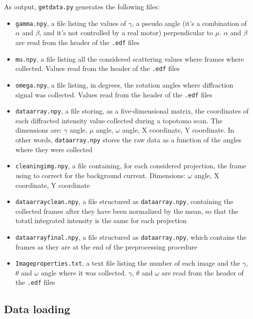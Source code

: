 \documentclass[11pt]{scrartcl}
\begin{document}
As output, {\texttt{getdata.py}} generates the following files:

\begin{itemize}
    \item {\texttt{gamma.npy}}, a file listing the values of $\gamma$, a pseudo angle (it's a combination of $\alpha$ and $\beta$, and it's not controlled by a real motor) perpendicular to $\mu$. $\alpha$ and $\beta$ are read from the header of the {\texttt{.edf}} files
    \item {\texttt{mu.npy}}, a file listing all the considered scattering values where frames where collected. Values read from the header of the {\texttt{.edf}} files
    \item {\texttt{omega.npy}}, a file listing, in degrees, the rotation angles where diffraction signal was collected. Values read from the header of the {\texttt{.edf}} files
    \item {\texttt{dataarray.npy}}, a file storing, as a five-dimensional matrix, the coordinates of each diffracted intensity value collected during a topotomo scan. The dimensions are: $\gamma$ angle, $\mu$ angle, $\omega$ angle, X coordinate, Y coordinate. In other words, {\texttt{dataarray.npy}} stores the raw data as a function of the angles where they were collected
    \item {\texttt{cleaning\textunderscore img.npy}}, a file containing, for each considered projection, the frame using to correct for the background current. Dimensions: $\omega$ angle, X coordinate, Y coordinate
    \item {\texttt{dataarray\textunderscore clean.npy}}, a file structured as {\texttt{dataarray.npy}}, containing the collected frames after they have been normalized by the mean, so that the totatl integrated intensity is the same for each projection
    \item {\texttt{dataarray\textunderscore final.npy}}, a file structured as {\texttt{dataarray.npy}}, which contains the frames as they are at the end of the preprocessing procedure
    \item {\texttt{Image\textunderscore properties.txt}}, a text file listing the number of each image and the $\gamma$, $\theta$ and $\omega$ angle where it was collected. $\gamma$, $\theta$ and $\omega$ are read from the header of the {\texttt{.edf}} files
\end{itemize}

\subsection{Data loading}
\end{document}
